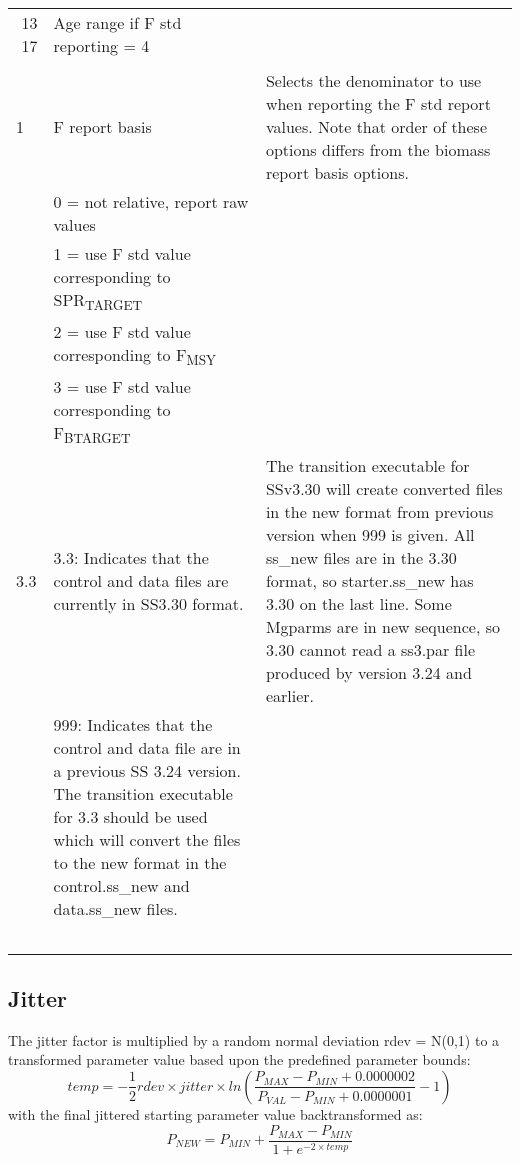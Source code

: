 \begin{landscape}
\begin{longtable}{p{3cm} p{7cm} p{11cm}}
 \multicolumn{1}{r}{13 17}  & Age range if F std reporting = 4 & \\
  \\

 \hline
 1 & F report basis &  \multirow{1}{1cm}[-0.1cm]{\parbox{11cm}{Selects the denominator to use when reporting the F std report values.  Note that order of these options differs from the biomass report basis options.}}\\
   & 0 = not relative, report raw values & \\
   & 1 = use F std value corresponding to SPR\textsubscript{TARGET} & \\
   & 2 = use F std value corresponding to F\textsubscript{MSY} & \\
   & 3 = use F std value corresponding to F\textsubscript{BTARGET} & \\
  
 \hline
 3.3 & 3.3: Indicates that the control and data files are currently in SS3.30 format. 
	 & \multirow{1}{1cm}[-0.1cm]{\parbox{11cm}{The transition executable for SSv3.30 will create converted files in the new format from previous version when 999 is given.  All ss\_new files are in the 3.30 format, so starter.ss\_new has 3.30 on the last line.  Some Mgparms are in new sequence, so 3.30 cannot read a ss3.par file produced by version 3.24 and earlier. }}\\
     & \multirow{1}{1cm}[-0.1cm]{\parbox{7cm}{999: Indicates that the control and data file are in a previous SS 3.24 version.  The transition executable for 3.3 should be used which will convert the files to the new format in the control.ss\_new and data.ss\_new files.}}  & \\  
     & & \\  
	 & & \\
     & & \\
   	 & & \\
     & & \\
    
    	
\end{longtable}
\end{landscape}
\restoregeometry

\subsection{Jitter}
\hypertarget{Jitter}{}
The jitter factor is multiplied by a random normal deviation rdev = N(0,1) to a transformed parameter value based upon the predefined parameter bounds:
\begin{equation}
temp = -\frac{1}{2}rdev \times jitter \times ln(\frac{P_{MAX} - P_{MIN} + 0.0000002}{P_{VAL}-P_{MIN} + 0.0000001}-1)
\end{equation}
with the final jittered starting parameter value backtransformed as:
\begin{equation}
P_{NEW} = P_{MIN} + \frac{P_{MAX}-P_{MIN}}{1+e^{-2 \times temp}}
\end{equation}